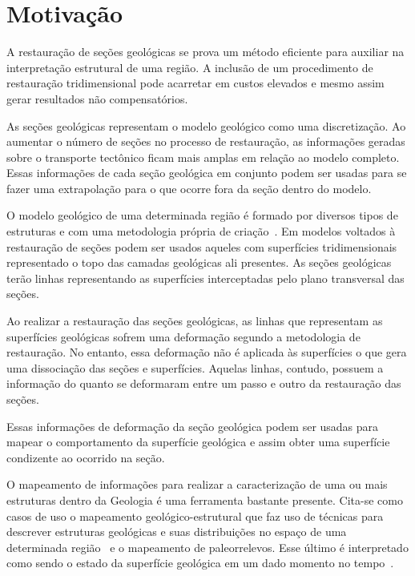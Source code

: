 \section{Motivação}

A restauração de seções geológicas se prova um método eficiente para auxiliar na interpretação estrutural de uma região. A inclusão de um procedimento de restauração tridimensional pode acarretar em custos elevados e mesmo assim gerar resultados não compensatórios.

As seções geológicas representam o modelo geológico como uma discretização. Ao aumentar o número de seções no processo de restauração, as informações geradas sobre o transporte tectônico ficam mais amplas em relação ao modelo completo. Essas informações de cada seção geológica em conjunto podem ser usadas para se fazer uma extrapolação para o que ocorre fora da seção dentro do modelo.

O modelo geológico de uma determinada região é formado por diversos tipos de estruturas e com uma metodologia própria de criação~\cite{Rodrigues}. Em modelos voltados à restauração de seções podem ser usados aqueles com superfícies tridimensionais representado o topo das camadas geológicas ali presentes. As seções geológicas terão linhas representando as superfícies interceptadas pelo plano transversal das seções.

Ao realizar a restauração das seções geológicas, as linhas que representam as superfícies geológicas sofrem uma deformação segundo a metodologia de restauração. No entanto, essa deformação não é aplicada às superfícies o que gera uma dissociação das seções e superfícies. Aquelas linhas, contudo, possuem a informação do quanto se deformaram entre um passo e outro da restauração das seções.

Essas informações de deformação da seção geológica podem ser usadas para mapear o comportamento da superfície geológica e assim obter uma superfície condizente ao ocorrido na seção.

O mapeamento de informações para realizar a caracterização de uma ou mais estruturas dentro da Geologia é uma ferramenta bastante presente. Cita-se como casos de uso o mapeamento geológico-estrutural que faz uso de técnicas para descrever estruturas geológicas e suas distribuições no espaço de uma determinada região~\cite{Borges, Felipe} e o mapeamento de paleorrelevos. Esse último é interpretado como sendo o estado da superfície geológica em um dado momento no tempo~\cite{Archela}.

